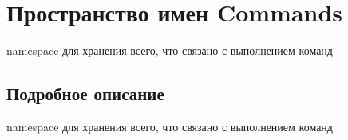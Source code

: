 \hypertarget{namespaceCommands}{}\section{Пространство имен Commands}
\label{namespaceCommands}


namespace для хранения всего, что связано с выполнением команд  




\subsection{Подробное описание}
namespace для хранения всего, что связано с выполнением команд 